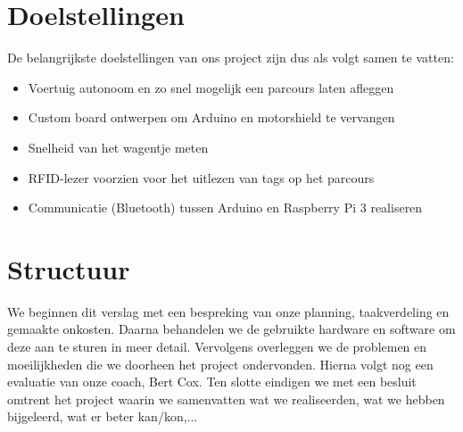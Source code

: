 \section{Doelstellingen}
De belangrijkste doelstellingen van ons project zijn dus als volgt samen te vatten:
\begin{itemize}
	\item Voertuig autonoom en zo snel mogelijk een parcours laten afleggen
	\item Custom board ontwerpen om Arduino en motorshield te vervangen
	\item Snelheid van het wagentje meten
	\item RFID-lezer voorzien voor het uitlezen van tags op het parcours
	\item Communicatie (Bluetooth) tussen Arduino en Raspberry Pi 3 realiseren
\end{itemize}
\section{Structuur}
We beginnen dit verslag met een bespreking van onze planning, taakverdeling en gemaakte onkosten. Daarna behandelen we de gebruikte hardware en software om deze aan te sturen in meer detail. Vervolgens overleggen we de problemen en moeilijkheden die we doorheen het project ondervonden. Hierna volgt nog een evaluatie van onze coach, Bert Cox. Ten slotte eindigen we met een besluit omtrent het project waarin we samenvatten wat we realiseerden, wat we hebben bijgeleerd, wat er beter kan/kon,...